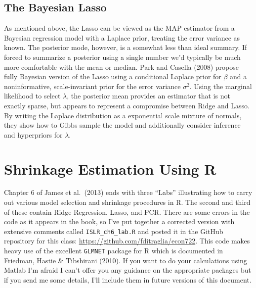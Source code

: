 \documentclass[12pt]{article}
\theoremstyle{definition}
\begin{document}




\subsection{The Bayesian Lasso}
As mentioned above, the Lasso can be viewed as the MAP estimator from a Bayesian regression model with a Laplace prior, treating the error variance as known. The posterior mode, however, is a somewhat less than ideal summary. If forced to summarize a posterior using a single number we'd typically be much more comfortable with the mean or median. Park and Casella (2008) propose fully Bayesian version of the Lasso using a conditional Laplace prior for $\beta$ and a noninformative, scale-invariant prior for the error variance $\sigma^2$. Using the marginal likelihood to select $\lambda$, the posterior mean provides an estimator that is not exactly sparse, but appears to represent a compromise between Ridge and Lasso. By writing the Laplace distribution as a exponential scale mixture of normals, they show how to Gibbs sample the model and additionally consider inference and hyperpriors for $\lambda$.


\section{Shrinkage Estimation Using R}
Chapter 6 of James et al.\ (2013) ends with three ``Labs'' illustrating how to carry out various model selection and shrinkage procedures in R. The second and third of these contain Ridge Regression, Lasso, and PCR. There are some errors in the code as it appears in the book, so I've put together a corrected version with extensive comments called \texttt{ISLR\_ch6\_lab.R} and posted it in the GitHub repository for this class: \url{https://github.com/fditraglia/econ722}. This code makes heavy use of the excellent \texttt{GLMNET} package for R which is documented in Friedman, Hastie \& Tibshirani (2010). If you want to do your calculations using Matlab I'm afraid I can't offer you any guidance on the appropriate packages but if you send me some details, I'll include them in future versions of this document.
\end{document}
